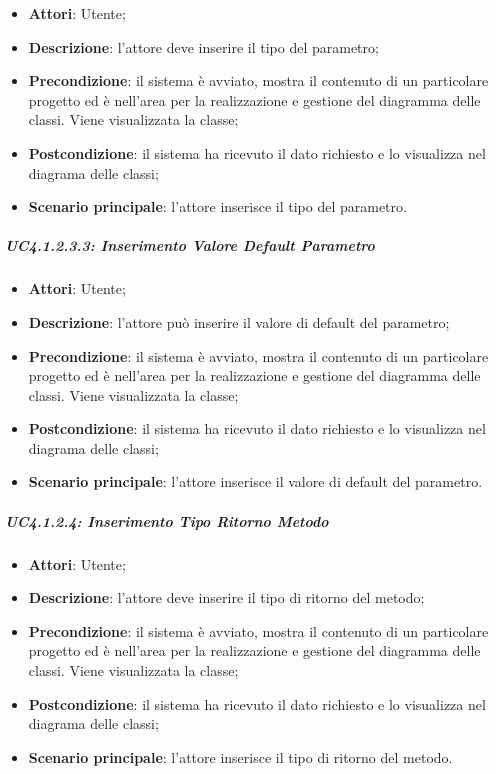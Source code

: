 \label{UC4.1.2.3.2}
\begin{itemize}
	\item \textbf{Attori}: Utente;
	\item \textbf{Descrizione}: l'attore deve inserire il tipo del parametro;
	\item \textbf{Precondizione}: il sistema è avviato, mostra il contenuto di un particolare progetto ed è nell'area per la realizzazione e gestione del diagramma delle classi. Viene visualizzata la classe;
	\item \textbf{Postcondizione}: il sistema ha ricevuto il dato richiesto e lo visualizza nel diagrama delle classi;
	\item \textbf{Scenario principale}: l'attore inserisce il tipo del parametro.
\end{itemize}

\subparagraph{UC4.1.2.3.3: Inserimento Valore Default Parametro}
\label{UC4.1.2.3.3}
\begin{itemize}
	\item \textbf{Attori}: Utente;
	\item \textbf{Descrizione}: l'attore può inserire il valore di default del parametro;
	\item \textbf{Precondizione}: il sistema è avviato, mostra il contenuto di un particolare progetto ed è nell'area per la realizzazione e gestione del diagramma delle classi. Viene visualizzata la classe;
	\item \textbf{Postcondizione}: il sistema ha ricevuto il dato richiesto e lo visualizza nel diagrama delle classi;
	\item \textbf{Scenario principale}: l'attore inserisce  il valore di default del parametro.
\end{itemize}

\subparagraph{UC4.1.2.4: Inserimento Tipo Ritorno Metodo}
\label{UC4.1.2.4}
\begin{itemize}
	\item \textbf{Attori}: Utente;
	\item \textbf{Descrizione}: l'attore deve inserire il tipo di ritorno del metodo;
	\item \textbf{Precondizione}: il sistema è avviato, mostra il contenuto di un particolare progetto ed è nell'area per la realizzazione e gestione del diagramma delle classi. Viene visualizzata la classe;
	\item \textbf{Postcondizione}: il sistema ha ricevuto il dato richiesto e lo visualizza nel diagrama delle classi;
	\item \textbf{Scenario principale}: l'attore inserisce il tipo di ritorno del metodo.
\end{itemize}

